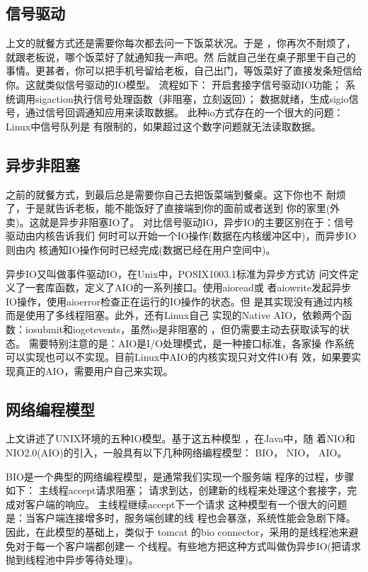 \subsection{信号驱动}
上文的就餐方式还是需要你每次都去问一下饭菜状况。于是
，你再次不耐烦了，就跟老板说，哪个饭菜好了就通知我一声吧。然
后就自己坐在桌子那里干自己的事情。更甚者，你可以把手机号留给老板，自己出门，等饭菜好了直接发条短信给你。这就类似信号驱动的IO模型。
流程如下：
开启套接字信号驱动IO功能；
系统调用sigaction执行信号处理函数（非阻塞，立刻返回）；
数据就绪，生成sigio信号，通过信号回调通知应用来读取数据。
此种io方式存在的一个很大的问题：Linux中信号队列是
有限制的，如果超过这个数字问题就无法读取数据。

\subsection{异步非阻塞}
之前的就餐方式，到最后总是需要你自己去把饭菜端到餐桌。这下你也不
耐烦了，于是就告诉老板，能不能饭好了直接端到你的面前或者送到
你的家里(外卖)。这就是异步非阻塞IO了。
对比信号驱动IO，异步IO的主要区别在于：信号驱动由内核告诉我们
何时可以开始一个IO操作(数据在内核缓冲区中)，而异步IO则由内
核通知IO操作何时已经完成(数据已经在用户空间中)。

异步IO又叫做事件驱动IO，在Unix中，POSIX1003.1标准为异步方式访
问文件定义了一套库函数，定义了AIO的一系列接口。使用aioread或
者aiowrite发起异步IO操作，使用aioerror检查正在运行的IO操作的状态。但
是其实现没有通过内核而是使用了多线程阻塞。此外，还有Linux自己
实现的Native AIO，依赖两个函数：iosubmit和iogetevents，虽然io是非阻塞的
，但仍需要主动去获取读写的状态。
需要特别注意的是：AIO是I/O处理模式，是一种接口标准，各家操
作系统可以实现也可以不实现。目前Linux中AIO的内核实现只对文件IO有
效，如果要实现真正的AIO，需要用户自己来实现。

\subsection{网络编程模型}
上文讲述了UNIX环境的五种IO模型。基于这五种模型
，在Java中，随
着NIO和NIO2.0(AIO)的引入，一般具有以下几种网络编程模型：
BIO，
NIO，
AIO。

BIO是一个典型的网络编程模型，是通常我们实现一个服务端
程序的过程，步骤如下：
主线程accept请求阻塞；
请求到达，创建新的线程来处理这个套接字，完成对客户端的响应。
主线程继续accept下一个请求
这种模型有一个很大的问题是：当客户端连接增多时，服务端创建的线
程也会暴涨，系统性能会急剧下降。因此，在此模型的基础上，类似于 tomcat
的bio connector，采用的是线程池来避免对于每一个客户端都创建一
个线程。有些地方把这种方式叫做伪异步IO(把请求抛到线程池中异步等待处理)。

